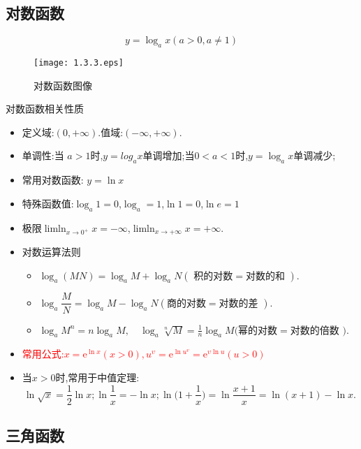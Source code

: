 \documentclass[8pt a4paper, oneside, UTF8]{ctexbook}  %
\begin{document}
\begin{sloppypar}
    \subsection{对数函数}
    $$
        y=\log_a x (a>0,a \neq 1)
    $$
    \begin{figure}[H]
        \centering \texttt{[image: 1.3.3.eps]} \caption{对数函数图像}
    \end{figure}
    \begin{criterion}{对数函数相关性质}{}
        \begin{itemize}
            \item 定义域:$(0,+\infty)$.值域:$(-\infty,+\infty)$.
            \item 单调性:当 $a>1$时,$y=log_a x$单调增加;当$0<a<1$时,$y=\log_a x$单调减少;
            \item 常用对数函数: $y=\ln x$
            \item 特殊函数值:$\log_a 1=0$,$\log_a=1$,$\ln 1=0$,$\ln e=1$
            \item 极限$\operatorname*{lim ln}_{x\to0^{+}}x=-\infty$,$\operatorname*{lim ln}_{x\to+\infty}x=+\infty$.
            \item 对数运算法则
                  \begin{itemize}
                      \item $\log_{a}\left(MN\right)=\log_{a}M+\log_{a}N\left(\text{ 积的对数}=\text{对数的和 }\right).$
                      \item $\log_{a}\dfrac{M}{N}=\log_{a}M-\log_{a}N\left(\text{商的对数}=\text{对数的差 }\right).$
                      \item $\log_aM^n=n\log_aM,\quad\log_a\sqrt[n]{M}=\frac1n\log_aM\text{(幂的对数}=\text{对数的倍数 }).$
                  \end{itemize}
            \item \textcolor{red}{常用公式:$x=\mathrm{e}^{\ln x}\left(x>0\right),u^{\upsilon}=\mathrm{e}^{\ln u^v}=\mathrm{e}^{\upsilon\ln u}\left(u>0\right)$}
            \item 当$x>0$时,常用于中值定理:
                  $$
                      \ln\sqrt{x}=\frac{1}{2}\ln x;\ln\frac{1}{x}=-\ln x;\ln\biggl(1+\frac{1}{x}\biggr)=\ln\frac{x+1}{x}=\ln(x+1)-\ln x.
                  $$
        \end{itemize}
    \end{criterion}
    \subsection{三角函数}


\end{sloppypar}
\end{document}
